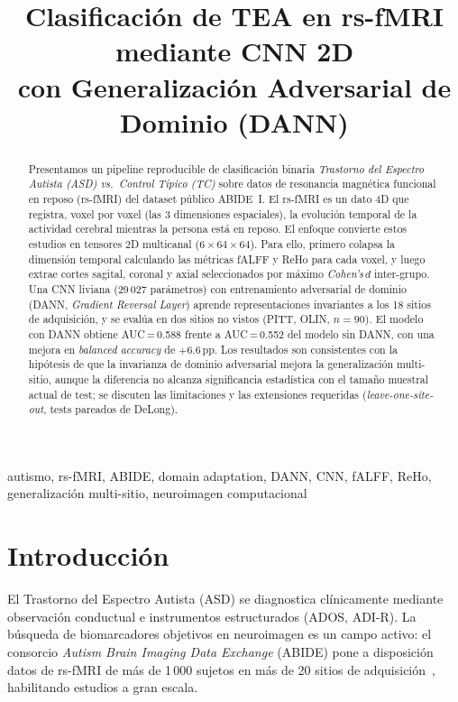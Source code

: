 \documentclass[conference]{IEEEtran}
\title{Clasificación de TEA en rs-fMRI mediante CNN 2D\\
       con Generalización Adversarial de Dominio (DANN)}
\author{
  \IEEEauthorblockN{Leandro Carcagno,\ Sebastián Mesch Henriques}
  \IEEEauthorblockA{Maestría en Inteligencia Artificial\\
    Universidad de San Andrés (UDESA), Argentina}
}
\begin{document}
\maketitle

\begin{abstract}
Presentamos un pipeline reproducible de clasificación binaria
\emph{Trastorno del Espectro Autista (ASD) vs.\ Control Típico (TC)}
sobre datos de resonancia magnética funcional en reposo (rs-fMRI) del
dataset público ABIDE~I. El rs-fMRI es un dato 4D que registra, voxel por voxel (las 3 dimensiones espaciales), la evolución temporal de la actividad cerebral mientras la persona está en reposo.
El enfoque convierte estos estudios en tensores 2D multicanal ($6{\times}64{\times}64$). Para ello, primero colapsa la dimensión temporal calculando las métricas fALFF y ReHo para cada voxel, y luego extrae cortes sagital, coronal y axial seleccionados por máximo
\emph{Cohen's\,$d$} inter-grupo. Una CNN liviana (29\,027 parámetros)
con entrenamiento adversarial de dominio (DANN, \emph{Gradient Reversal
Layer}) aprende representaciones invariantes a los 18 sitios de
adquisición, y se evalúa en dos sitios no vistos (PITT, OLIN,
$n\!=\!90$). El modelo con DANN obtiene AUC\,=\,0.588 frente a
AUC\,=\,0.552 del modelo sin DANN, con una mejora en \emph{balanced
accuracy} de $+$6.6\,pp. Los resultados son consistentes con la
hipótesis de que la invarianza de dominio adversarial mejora la
generalización multi-sitio, aunque la diferencia no alcanza
significancia estadística con el tamaño muestral actual de test;
se discuten las limitaciones y las extensiones requeridas
(\emph{leave-one-site-out}, tests pareados de DeLong).
\end{abstract}

\begin{IEEEkeywords}
autismo, rs-fMRI, ABIDE, domain adaptation, DANN, CNN, fALFF, ReHo,
generalización multi-sitio, neuroimagen computacional
\end{IEEEkeywords}

\section{Introducción}

El Trastorno del Espectro Autista (ASD) se diagnostica clínicamente
mediante observación conductual e instrumentos estructurados (ADOS,
ADI-R). La búsqueda de biomarcadores objetivos en neuroimagen es un
campo activo: el consorcio \emph{Autism Brain Imaging Data Exchange}
(ABIDE) pone a disposición datos de rs-fMRI de más de 1\,000 sujetos
en más de 20 sitios de adquisición~\cite{diMartino2014}, habilitando
estudios a gran escala.
\end{document}
